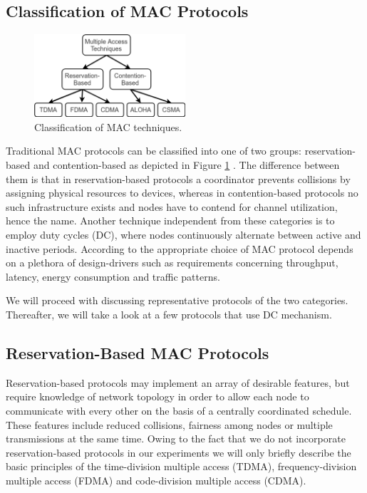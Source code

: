 \subsection{Classification of MAC Protocols}

\begin{figure}[tb] \label{fig:mac-classification}
	\begin{center}
		\includegraphics[width=0.5\textwidth]{pictures/mac_classification}
	\end{center}
	\caption{Classification of MAC techniques.}
\end{figure}

Traditional MAC protocols can be classified into one of two groups: reservation-based and contention-based as depicted in Figure \ref{fig:mac-classification} \cite{Garg07}. The difference between them is that in reservation-based protocols a coordinator prevents collisions by assigning physical resources to devices, whereas in contention-based protocols no such infrastructure exists and nodes have to contend for channel utilization, hence the name. Another technique independent from these categories is to employ duty cycles (DC), where nodes continuously alternate between active and inactive periods. According to \cite{Bachir10} the appropriate choice of MAC protocol depends on a plethora of design-drivers such as requirements concerning throughput, latency, energy consumption and traffic patterns. 

We will proceed with discussing representative protocols of the two categories. Thereafter, we will take a look at a few protocols that use DC mechanism.

\subsection{Reservation-Based MAC Protocols}
\label{sec:reservation-mac}

Reservation-based protocols may implement an array of desirable features, but require knowledge of network topology in order to allow each node to communicate with every other on the basis of a centrally coordinated schedule. These features include reduced collisions, fairness among nodes or multiple transmissions at the same time. Owing to the fact that we do not incorporate reservation-based protocols in our experiments we will only briefly describe the basic principles of the time-division multiple access (TDMA), frequency-division multiple access (FDMA) and code-division multiple access (CDMA). 

